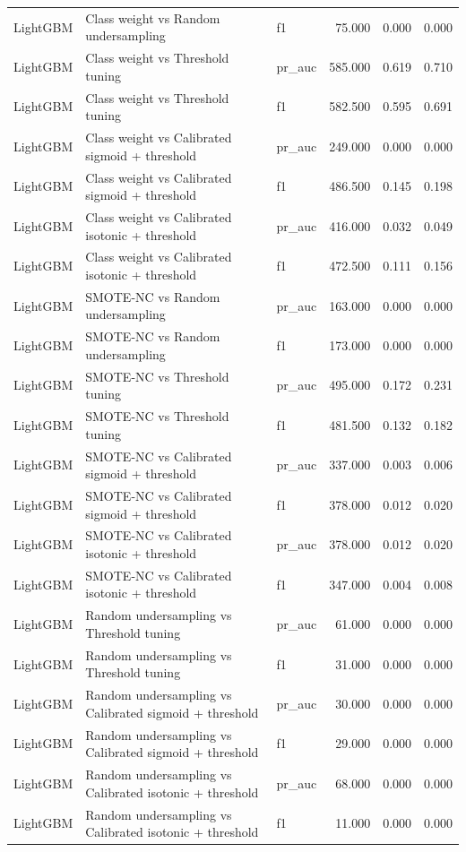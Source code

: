 \begin{tabular}{lllrrr}
LightGBM & Class weight vs Random undersampling & f1 & 75.000 & 0.000 & 0.000 \\
LightGBM & Class weight vs Threshold tuning & pr_auc & 585.000 & 0.619 & 0.710 \\
LightGBM & Class weight vs Threshold tuning & f1 & 582.500 & 0.595 & 0.691 \\
LightGBM & Class weight vs Calibrated sigmoid + threshold & pr_auc & 249.000 & 0.000 & 0.000 \\
LightGBM & Class weight vs Calibrated sigmoid + threshold & f1 & 486.500 & 0.145 & 0.198 \\
LightGBM & Class weight vs Calibrated isotonic + threshold & pr_auc & 416.000 & 0.032 & 0.049 \\
LightGBM & Class weight vs Calibrated isotonic + threshold & f1 & 472.500 & 0.111 & 0.156 \\
LightGBM & SMOTE-NC vs Random undersampling & pr_auc & 163.000 & 0.000 & 0.000 \\
LightGBM & SMOTE-NC vs Random undersampling & f1 & 173.000 & 0.000 & 0.000 \\
LightGBM & SMOTE-NC vs Threshold tuning & pr_auc & 495.000 & 0.172 & 0.231 \\
LightGBM & SMOTE-NC vs Threshold tuning & f1 & 481.500 & 0.132 & 0.182 \\
LightGBM & SMOTE-NC vs Calibrated sigmoid + threshold & pr_auc & 337.000 & 0.003 & 0.006 \\
LightGBM & SMOTE-NC vs Calibrated sigmoid + threshold & f1 & 378.000 & 0.012 & 0.020 \\
LightGBM & SMOTE-NC vs Calibrated isotonic + threshold & pr_auc & 378.000 & 0.012 & 0.020 \\
LightGBM & SMOTE-NC vs Calibrated isotonic + threshold & f1 & 347.000 & 0.004 & 0.008 \\
LightGBM & Random undersampling vs Threshold tuning & pr_auc & 61.000 & 0.000 & 0.000 \\
LightGBM & Random undersampling vs Threshold tuning & f1 & 31.000 & 0.000 & 0.000 \\
LightGBM & Random undersampling vs Calibrated sigmoid + threshold & pr_auc & 30.000 & 0.000 & 0.000 \\
LightGBM & Random undersampling vs Calibrated sigmoid + threshold & f1 & 29.000 & 0.000 & 0.000 \\
LightGBM & Random undersampling vs Calibrated isotonic + threshold & pr_auc & 68.000 & 0.000 & 0.000 \\
LightGBM & Random undersampling vs Calibrated isotonic + threshold & f1 & 11.000 & 0.000 & 0.000 \\

\end{tabular}
